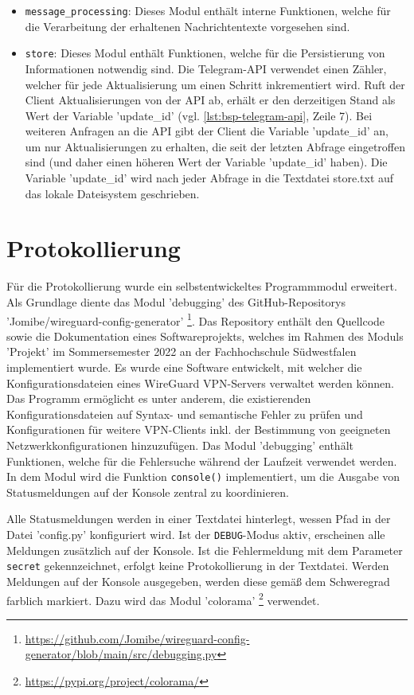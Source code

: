 \begin{itemize}
\item \lstinline{message_processing}: Dieses Modul enthält interne Funktionen, welche für die Verarbeitung der erhaltenen Nachrichtentexte vorgesehen sind. 
\item \lstinline{store}: Dieses Modul enthält Funktionen, welche für die Persistierung von Informationen notwendig sind. Die Telegram-API verwendet einen Zähler, welcher für jede Aktualisierung um einen Schritt inkrementiert wird. Ruft der Client Aktualisierungen von der API ab, erhält er den derzeitigen Stand als Wert der Variable 'update\_id' (vgl. \autoref{lst:bsp-telegram-api}, Zeile 7). Bei weiteren Anfragen an die API gibt der Client die Variable 'update\_id' an, um nur Aktualisierungen zu erhalten, die seit der letzten Abfrage eingetroffen sind (und daher einen höheren Wert der Variable 'update\_id' haben). Die Variable 'update\_id' wird nach jeder Abfrage in die Textdatei store.txt auf das lokale Dateisystem geschrieben.
\end{itemize}

\section{Protokollierung}
\label{sec:protokollierung}

Für die Protokollierung wurde ein selbstentwickeltes Programmmodul erweitert. Als Grundlage diente das Modul 'debugging' des GitHub-Repositorys 'Jomibe/wireguard-config-generator' \footnote{\url{https://github.com/Jomibe/wireguard-config-generator/blob/main/src/debugging.py}}. Das Repository enthält den Quellcode sowie die Dokumentation eines Softwareprojekts, welches im Rahmen des Moduls 'Projekt' im Sommersemester 2022 an der Fachhochschule Südwestfalen implementiert wurde. Es wurde eine Software entwickelt, mit welcher die Konfigurationsdateien eines WireGuard VPN-Servers verwaltet werden können. Das Programm ermöglicht es unter anderem, die existierenden Konfigurationsdateien auf Syntax- und semantische Fehler zu prüfen und Konfigurationen für weitere VPN-Clients inkl. der Bestimmung von geeigneten Netzwerkkonfigurationen hinzuzufügen. Das Modul 'debugging' enthält Funktionen, welche für die Fehlersuche während der Laufzeit verwendet werden. In dem Modul wird die Funktion \lstinline{console()} implementiert, um die Ausgabe von Statusmeldungen auf der Konsole zentral zu koordinieren. 

Alle Statusmeldungen werden in einer Textdatei hinterlegt, wessen Pfad in der Datei 'config.py' konfiguriert wird. Ist der \lstinline{DEBUG}-Modus aktiv, erscheinen alle Meldungen zusätzlich auf der Konsole. Ist die Fehlermeldung mit dem Parameter \lstinline{secret} gekennzeichnet, erfolgt keine Protokollierung in der Textdatei. Werden Meldungen auf der Konsole ausgegeben, werden diese gemäß dem Schweregrad farblich markiert. Dazu wird das Modul 'colorama' \footnote{\url{https://pypi.org/project/colorama/}} verwendet.

